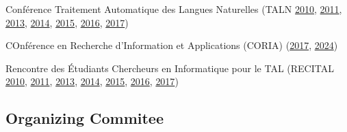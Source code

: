 \begin{itemize*}[label={},
                 itemjoin={{,\space}},
                 afterlabel={},
                 after={{.}}]

    \item Conférence Traitement Automatique des Langues Naturelles
    (TALN
    \href{https://aclanthology.org/events/jeptalnrecital-2010/}{2010},
    \href{https://aclanthology.org/events/jeptalnrecital-2011/}{2011},
    \href{https://aclanthology.org/F13-1000.pdf}{2013},
    \href{https://aclanthology.org/events/jeptalnrecital-2014/}{2014},
    \href{https://aclanthology.org/events/jeptalnrecital-2015/}{2015},
    \href{https://aclanthology.org/2016.jeptalnrecital-long.0.pdf}{2016},
    \href{https://aclanthology.org/2017.jeptalnrecital-long.0.pdf}{2017})

    \item COnférence en Recherche d’Information et Applications (CORIA)
    (\href{https://www.asso-aria.org/coria/2017/CORIA2017_actes.pdf}{2017}, 
    \href{https://coria.asso-aria.org/2024/organizers/pc/}{2024})

    \item Rencontre des Étudiants Chercheurs en Informatique pour le TAL
    (RECITAL
    \href{https://aclanthology.org/events/jeptalnrecital-2010/}{2010},
    \href{https://aclanthology.org/events/jeptalnrecital-2011/}{2011},
    \href{https://aclanthology.org/F13-5000/}{2013}, 
    \href{https://aclanthology.org/F14-4000/}{2014}, 
    \href{https://aclanthology.org/volumes/2015.jeptalnrecital-recital/}{2015}, 
    \href{https://aclanthology.org/2016.jeptalnrecital-recital.0.pdf}{2016},
    \href{https://aclanthology.org/2017.jeptalnrecital-recital.0.pdf}{2017})

\end{itemize*}

\subsection*{Organizing Commitee}

